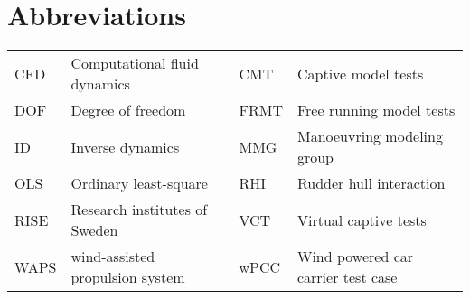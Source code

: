 \documentclass[preprint,11pt,authoryear]{elsarticle}
\begin{document}
\FloatBarrier

\section*{Abbreviations}
\label{sec:introduction}
\begin{table}[h]
    \centering
    \scriptsize
    \label{tab:abbreviations}
    \begin{tabular}{l l l l}

    CFD & Computational fluid dynamics & CMT & Captive model tests \\
    
    DOF & Degree of freedom &  FRMT & Free running model tests \\
    ID & Inverse dynamics &  MMG & Manoeuvring modeling group \\
    OLS & Ordinary least-square &  RHI & Rudder hull interaction \\
    RISE & Research institutes of Sweden &  VCT & Virtual captive tests \\
    WAPS & wind-assisted propulsion system &  wPCC & Wind powered car carrier test case\\
    \end{tabular}
        
\end{table}
\FloatBarrier
\end{document}
